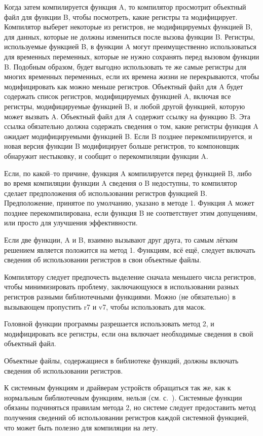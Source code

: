 \documentclass[forwardcom.tex]{subfiles}
\begin{document}
Когда затем компилируется функция A, то компилятор просмотрит объектный файл для функции B, чтобы посмотреть, какие регистры та модифицирует. Компилятор выберет некоторые из регистров, не модифицируемых функцией B, для данных, которые не должны измениться после вызова функции B. Регистры, используемые функцией B, в функции A могут преимущественно использоваться для временных переменных, которые не нужно сохранять перед вызовом функции B. Подобным образом, будет выгодно использовать те же самые регистры для многих временных переменных, если их времена жизни не перекрываются, чтобы модифицировать как можно меньше регистров. Объектный файл для A будет содержать список регистров, модифицируемых функцией A, включая все регистры, модифицируемые функцией B, и любой другой функцией, которую может вызвать A. Объектный файл для A содержит ссылку на функцию B. Эта ссылка обязательно должна содержать сведения о том, какие регистры функция A ожидает модифицируемыми функцией B. Если B позднее перекомпилируется, и новая версия функции B модифицирует больше регистров, то компоновщик обнаружит нестыковку,  и сообщит о перекомпиляции функции A.

Если, по какой--то причине, функция A компилируется перед функцией B, либо во время компиляции функции A сведения о B недоступны, то компилятор сделает предположения об использовании регистров функцией B. Предположение, принятое по умолчанию, указано в методе 1. Функция A может позднее перекомпилирована, если функция B не соответствует этим допущениям, или просто для улучшения эффективности.

Если две функции, A и B, взаимно вызывают друг друга, то самым лёгким решением является положится на метод 1. Функциям, всё ещё, следует включать сведения об использовании регистров в свои объектные файлы.

Компилятору следует предпочесть выделение сначала меньшего числа регистров, чтобы минимизировать проблему, заключающуюся в использовании разных регистров разными библиотечными функциями. Можно (не обязательно) в вызывающем пропустить r7 и v7, чтобы использовать для масок.

Головной функции программы разрешается использовать метод 2, и модифицировать все регистры, если она включает необходимые сведения в свой объектный файл.

Объектные файлы, содержащиеся в библиотеке функций, должны включать сведения об использовании регистров. 

К системным функциям и драйверам устройств обращаться так же, как к нормальным библиотечным функциям, нельзя (см. с.~\pageref{systemCallIDSystem}). Системные функции обязаны подчиняться правилам метода 2, но системе следует предоставить метод получения сведений об использовании регистров каждой системной функцией, что может быть полезно для компиляции \glqq на лету\glqq.
\end{document}
